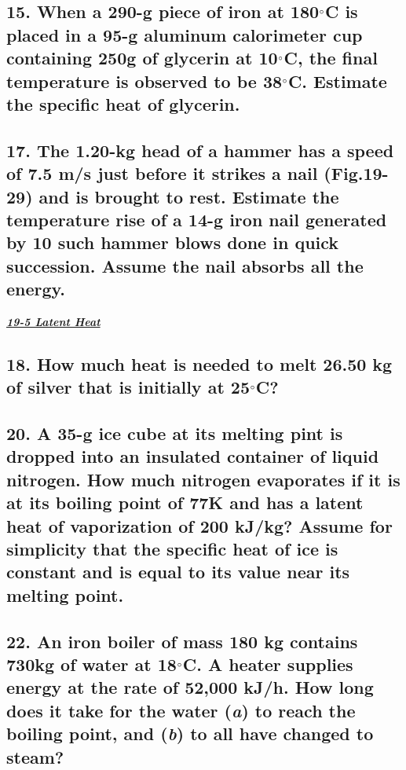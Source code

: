 \documentclass{article}
\begin{document}
\subsection*{15. When a 290-g piece of iron at 180$\degree$C is placed in a 95-g aluminum calorimeter cup containing 250g of glycerin at 10$\degree$C, the final temperature is observed to be 38$\degree$C. Estimate the specific heat of glycerin.}

\subsection*{17. The 1.20-kg head of a hammer has a speed of 7.5 m/s just before it strikes a nail (Fig.19-29) and is brought to rest. Estimate the temperature rise of a 14-g iron nail generated by 10 such hammer blows done in quick succession. Assume the nail absorbs all the energy.}
\vspace{1em}
\large{\textbf{\textit{\underline{19-5 Latent Heat}}}} \\

\subsection*{18. How much heat is needed to melt 26.50 kg of silver that is initially at 25$\degree$C?}

\subsection*{20. A 35-g ice cube at its melting pint is dropped into an insulated container of liquid nitrogen. How much nitrogen evaporates if it is at its boiling point of 77K and has a latent heat of vaporization of 200 kJ/kg? Assume for simplicity that the specific heat of ice is constant and is equal to its value near its melting point.}

\subsection*{22. An iron boiler of mass 180 kg contains 730kg of water at 18$\degree$C. A heater supplies energy at the rate of 52,000 kJ/h. How long does it take for the water (\textit a) to reach the boiling point, and (\textit b) to all have changed to steam?}
\end{document}
